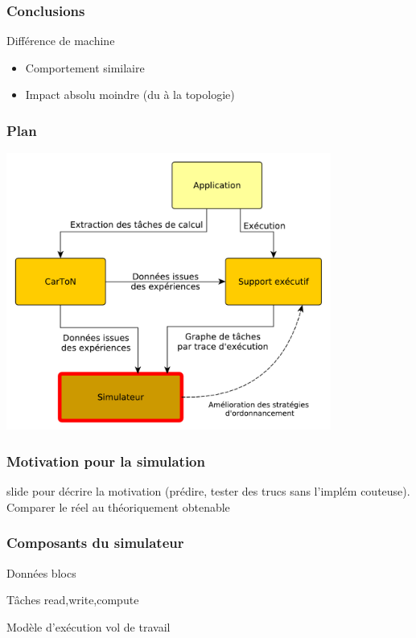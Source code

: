 \documentclass[xcolor={usenames,dvipsnames,svgnames,table}, aspectratio=43]{beamer}
\begin{document}
\begin{frame}
  \frametitle{Conclusions}

  \begin{block}{Différence de machine}
    \begin{itemize}
      \item Comportement similaire
      \item Impact absolu moindre (du à la topologie)
    \end{itemize}
  \end{block}

\end{frame}


\begin{frame}
  \frametitle{Plan}
  \includegraphics[width=0.8\textwidth]{graph/big_picture-part3.pdf}
\end{frame}


\begin{frame}[fragile]
  \frametitle{Motivation pour la simulation}
  slide pour décrire la motivation (prédire, tester des trucs sans l'implém couteuse).
  Comparer le réel au théoriquement obtenable

\end{frame}

\begin{frame}
  \frametitle{Composants du simulateur}
  Données
    blocs

  Tâches
    read,write,compute

  Modèle d'exécution
    vol de travail

\end{frame}
\end{document}
